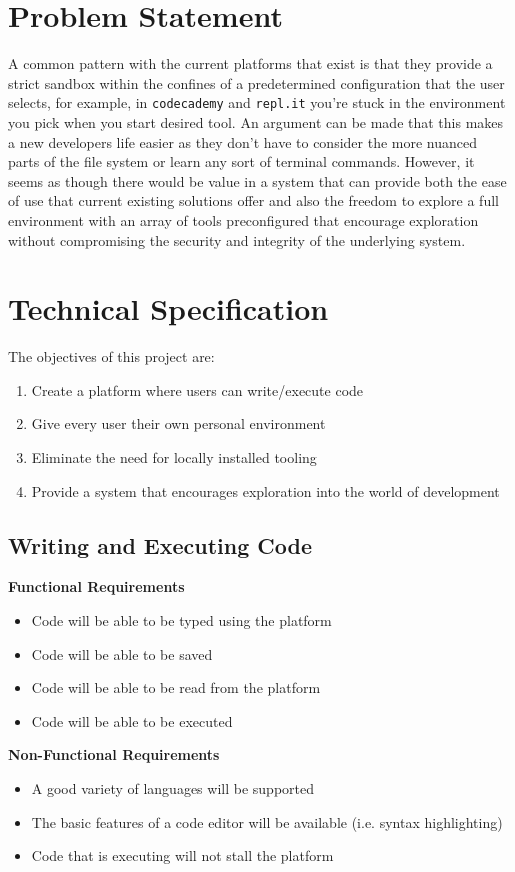 \section{Problem Statement}
A common pattern with the current platforms that exist is that they provide a strict sandbox within the confines of a predetermined configuration that the user selects, for example, in \texttt{codecademy} and \texttt{repl.it} you're stuck in the environment you pick when you start desired tool. An argument can be made that this makes a new developers life easier as they don't have to consider the more nuanced parts of the file system or learn any sort of terminal commands. However, it seems as though there would be value in a system that can provide both the ease of use that current existing solutions offer and also the freedom to explore a full environment with an array of tools preconfigured that encourage exploration without compromising the security and integrity of the underlying system.

\section{Technical Specification}
The objectives of this project are: 
\begin{enumerate}
    \item Create a platform where users can write/execute code
    \item Give every user their own personal environment
    \item Eliminate the need for locally installed tooling
    \item Provide a system that encourages exploration into the world of development
\end{enumerate}

\subsection{Writing and Executing Code}
\textbf{Functional Requirements}
\begin{itemize}
    \item Code will be able to be typed using the platform
    \item Code will be able to be saved
    \item Code will be able to be read from the platform
    \item Code will be able to be executed
\end{itemize}
\textbf{Non-Functional Requirements}
\begin{itemize}
    \item A good variety of languages will be supported
    \item The basic features of a code editor will be available (i.e. syntax highlighting)
    \item Code that is executing will not stall the platform
\end{itemize}

